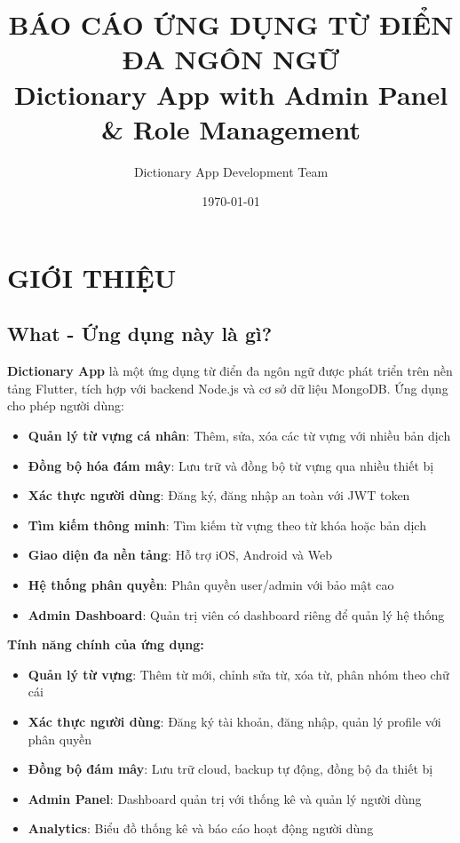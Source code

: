 \documentclass[12pt,a4paper]{article}
\title{\textbf{BÁO CÁO ỨNG DỤNG TỪ ĐIỂN ĐA NGÔN NGỮ\\[0.5cm] Dictionary App with Admin Panel \& Role Management}}
\author{Dictionary App Development Team}
\date{\today}
\begin{document}
\maketitle
\thispagestyle{empty}

\newpage
\tableofcontents
\newpage

\section{GIỚI THIỆU}

\subsection{What - Ứng dụng này là gì?}

\textbf{Dictionary App} là một ứng dụng từ điển đa ngôn ngữ được phát triển trên nền tảng Flutter, tích hợp với backend Node.js và cơ sở dữ liệu MongoDB. Ứng dụng cho phép người dùng:

\begin{itemize}
    \item \textbf{Quản lý từ vựng cá nhân}: Thêm, sửa, xóa các từ vựng với nhiều bản dịch
    \item \textbf{Đồng bộ hóa đám mây}: Lưu trữ và đồng bộ từ vựng qua nhiều thiết bị
    \item \textbf{Xác thực người dùng}: Đăng ký, đăng nhập an toàn với JWT token
    \item \textbf{Tìm kiếm thông minh}: Tìm kiếm từ vựng theo từ khóa hoặc bản dịch
    \item \textbf{Giao diện đa nền tảng}: Hỗ trợ iOS, Android và Web
    \item \textbf{Hệ thống phân quyền}: Phân quyền user/admin với bảo mật cao
    \item \textbf{Admin Dashboard}: Quản trị viên có dashboard riêng để quản lý hệ thống
\end{itemize}

\textbf{Tính năng chính của ứng dụng:}
\begin{itemize}
    \item \textbf{Quản lý từ vựng}: Thêm từ mới, chỉnh sửa từ, xóa từ, phân nhóm theo chữ cái
    \item \textbf{Xác thực người dùng}: Đăng ký tài khoản, đăng nhập, quản lý profile với phân quyền
    \item \textbf{Đồng bộ đám mây}: Lưu trữ cloud, backup tự động, đồng bộ đa thiết bị
    \item \textbf{Admin Panel}: Dashboard quản trị với thống kê và quản lý người dùng
    \item \textbf{Analytics}: Biểu đồ thống kê và báo cáo hoạt động người dùng
\end{itemize}
\end{document}
